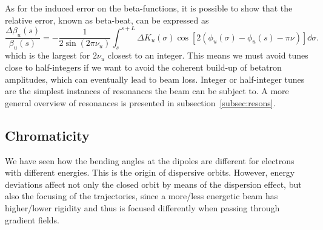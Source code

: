     As for the induced error on the beta-functions, it is possible to show that the relative error, known as beta-beat, can be expressed as
     \begin{equation}
        \frac{\Delta \beta_u(s)}{\beta_u(s)} = - \frac{1}{2\sin(2\pi\nu_u)}\int_{s}^{s+L}\Delta K_u(\sigma)\cos[2(\phi_u(\sigma)-\phi_u(s)-\pi\nu)]\dd\sigma.
        \label{eq:beta_beat}
     \end{equation}
which is the largest for $2\nu_u$ closest to an integer. This means we must avoid tunes close to half-integers if we want to avoid the coherent build-up of betatron amplitudes, which can eventually lead to beam loss.
Integer or half-integer tunes are the simplest instances of resonances the beam can be subject to. A more general overview of resonances is presented in subsection~\ref{subsec:resons}.
\subsection{Chromaticity}
We have seen how the bending angles at the dipoles are different for electrons with different energies. This is the origin of dispersive orbits. However, energy deviations affect not only the closed orbit by means of the dispersion effect, but also the focusing of the trajectories, since a more/less energetic beam has higher/lower rigidity and thus is focused differently when passing through gradient fields.
%

